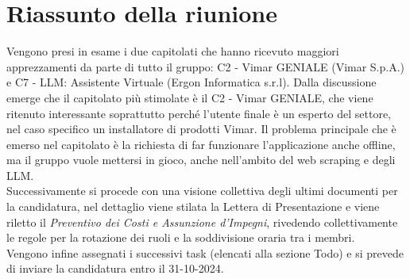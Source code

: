 \section{Riassunto della riunione}
    Vengono presi in esame i due capitolati che hanno ricevuto maggiori apprezzamenti da parte di tutto il gruppo: C2 - Vimar GENIALE (Vimar S.p.A.) e C7 - LLM: Assistente Virtuale (Ergon Informatica s.r.l). Dalla discussione emerge che il capitolato più stimolate è il C2 - Vimar GENIALE, che viene ritenuto interessante soprattutto perché l'utente finale è un esperto del settore, nel caso specifico un installatore di prodotti Vimar.
    Il problema principale che è emerso nel capitolato è la richiesta di far funzionare l'applicazione anche offline, ma il gruppo vuole mettersi in gioco, anche nell'ambito del web scraping e degli LLM.
\bigskip
    \\Successivamente si procede con una visione collettiva degli ultimi documenti per la candidatura, nel dettaglio viene stilata la Lettera di Presentazione e viene riletto il \textit{Preventivo dei Costi e Assunzione d'Impegni}, rivedendo collettivamente le regole per la rotazione dei ruoli e la soddivisione oraria tra i membri.
    \bigskip 
    \bigskip
    \\Vengono infine assegnati i successivi task (elencati alla sezione Todo) e si prevede di inviare la candidatura entro il 31-10-2024.

